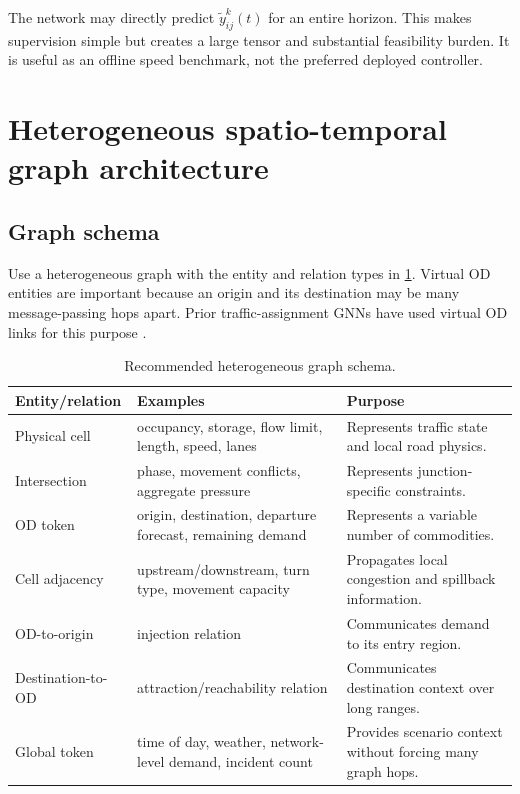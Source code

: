 \documentclass[11pt]{article}
\begin{document}
The network may directly predict \(\widetilde y_{ij}^k(t)\) for an entire horizon.
This makes supervision simple but creates a large tensor and substantial feasibility
burden.  It is useful as an offline speed benchmark, not the preferred deployed
controller.

\section{Heterogeneous spatio-temporal graph architecture}

\subsection{Graph schema}

Use a heterogeneous graph with the entity and relation types in
\cref{tab:heterograph}.  Virtual OD entities are important because an origin and its
destination may be many message-passing hops apart.  Prior traffic-assignment GNNs
have used virtual OD links for this purpose \citep{liu2024hetgat,liu2024hstgsn}.

\begin{table}[ht]
\centering
\caption{Recommended heterogeneous graph schema.}
\label{tab:heterograph}
\begin{tabularx}{\textwidth}{@{}p{}p{}X@{}}
\toprule
Entity/relation & Examples & Purpose \\
\midrule
Physical cell & occupancy, storage, flow limit, length, speed, lanes & Represents traffic state and local road physics. \\
Intersection & phase, movement conflicts, aggregate pressure & Represents junction-specific constraints. \\
OD token & origin, destination, departure forecast, remaining demand & Represents a variable number of commodities. \\
Cell adjacency & upstream/downstream, turn type, movement capacity & Propagates local congestion and spillback information. \\
OD-to-origin & injection relation & Communicates demand to its entry region. \\
Destination-to-OD & attraction/reachability relation & Communicates destination context over long ranges. \\
Global token & time of day, weather, network-level demand, incident count & Provides scenario context without forcing many graph hops. \\
\bottomrule
\end{tabularx}
\end{table}
\end{document}
